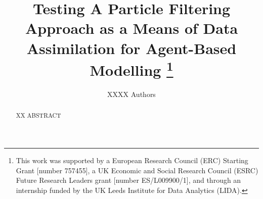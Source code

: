 \documentclass[runningheads]{llncs}
\begin{document}
%
\title{Testing A Particle Filtering Approach as a Means of Data Assimilation for Agent-Based Modelling
\thanks{This work was supported by a European Research Council (ERC) Starting Grant [number 757455], a UK Economic and Social Research Council (ESRC) Future Research Leaders grant [number ES/L009900/1], and through an internship funded by the UK Leeds Institute for Data Analytics (LIDA).}}

%
%

\author{ XXXX Authors } 
%

%

%
\maketitle              %
%
\begin{abstract}

XX ABSTRACT


\end{abstract}
%
%
%
 










\end{document}
